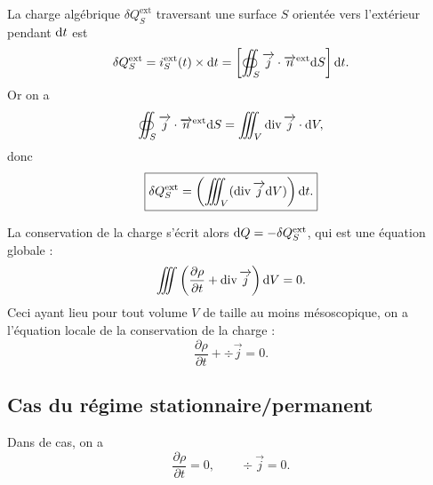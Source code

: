         La charge algébrique $\delta Q_{S}^{\text{ext}}$ traversant une surface $S$ orientée vers l'extérieur pendant $\mathrm{d} t$ est 
        \begin{equation}
            \delta Q_S^{\text{ext}}=i_{S}^{\text{ext}}(t)\times\mathrm{d} t=\left[
                \oiint_{S}\protect\overrightarrow{{j}}\cdot\protect\overrightarrow{{n}}^{\text{ext}}\mathrm{d} S
            \right]\mathrm{d} t.
        \end{equation}
        Or on a 
        \begin{equation}
            \oiint_{S}\protect\overrightarrow{{j}}\cdot\protect\overrightarrow{{n}}^{\text{ext}}\mathrm{d} S=\iiint_{V}\operatorname{div}\protect\overrightarrow{{j}}\cdot\mathrm{d} V,
        \end{equation}
        donc
        \begin{equation}
            \boxed{
                \delta Q_S^{\text{ext}}=\left(
                    \iiint_{V}(\operatorname{div}\protect\overrightarrow{{j}}\mathrm{d} V)
                \right)\mathrm{d} t.
            }
        \end{equation}

        La conservation de la charge s'écrit alors $\mathrm{d} Q=-\delta Q_S^{\text{ext}}$, qui est une équation globale :
        \begin{equation}
            \iiint\left(\frac{\partial\rho}{\partial t}+\operatorname{div}\protect\overrightarrow{{j}}\right)\mathrm{d} V=0.
        \end{equation}
        Ceci ayant lieu pour tout volume $V$ de taille au moins mésoscopique, on a l'équation locale de la conservation de la charge :
        \begin{equation}
            \boxed{
                \frac{\partial\rho}{\partial t}+\div\vec{j}=0.
            }
        \end{equation}

    \subsection{Cas du régime stationnaire/permanent}

        Dans de cas, on a 
        \begin{equation}
            \boxed{
                \dfrac{\partial\rho}{\partial t}=0,\qquad\div\vec{j}=0.
            }
        \end{equation}

